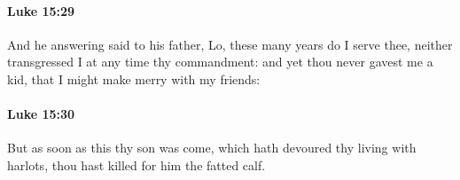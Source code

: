 		\paragraph{Luke 15:29} %
			\label{LUKE-15-29}

			And he answering said to his father, Lo, these many years do I serve thee, neither transgressed I at any time thy commandment: and yet thou never gavest me a kid, that I might make merry with my friends:

			\begin{framed}
			\scriptsize
				\begin{compactdesc}
					\item[SBLG] 
				\end{compactdesc}
			\end{framed}

		\paragraph{Luke 15:30} %
			\label{LUKE-15-30}

			But as soon as this thy son was come, which hath devoured thy living with harlots, thou hast killed for him the fatted calf.


